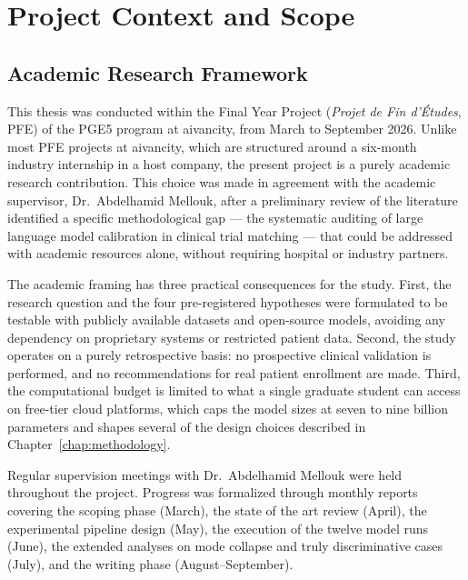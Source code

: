 
\chapter{Project Context and Scope}
\label{chap:context}

\section{Academic Research Framework}
\label{sec:ctx-framework}

This thesis was conducted within the Final Year Project (\emph{Projet de 
Fin d'\'Etudes}, PFE) of the PGE5 program at aivancity, from March to 
September 2026. Unlike most PFE projects at aivancity, which are 
structured around a six-month industry internship in a host company, the 
present project is a purely academic research contribution. This choice 
was made in agreement with the academic supervisor, Dr.\ Abdelhamid Mellouk, 
after a preliminary review of the literature identified a specific 
methodological gap --- the systematic auditing of large language model 
calibration in clinical trial matching --- that could be addressed with 
academic resources alone, without requiring hospital or industry partners.

The academic framing has three practical consequences for the study. 
First, the research question and the four pre-registered hypotheses 
were formulated to be testable with publicly available datasets and 
open-source models, avoiding any dependency on proprietary systems or 
restricted patient data. Second, the study operates on a purely 
retrospective basis: no prospective clinical validation is performed, 
and no recommendations for real patient enrollment are made. Third, the 
computational budget is limited to what a single graduate student can 
access on free-tier cloud platforms, which caps the model sizes at 
seven to nine billion parameters and shapes several of the design 
choices described in Chapter~\ref{chap:methodology}.

Regular supervision meetings with Dr.\ Abdelhamid Mellouk were held throughout the 
project. Progress was formalized through monthly reports covering the 
scoping phase (March), the state of the art review (April), the 
experimental pipeline design (May), the execution of the twelve model 
runs (June), the extended analyses on mode collapse and truly 
discriminative cases (July), and the writing phase (August--September).

